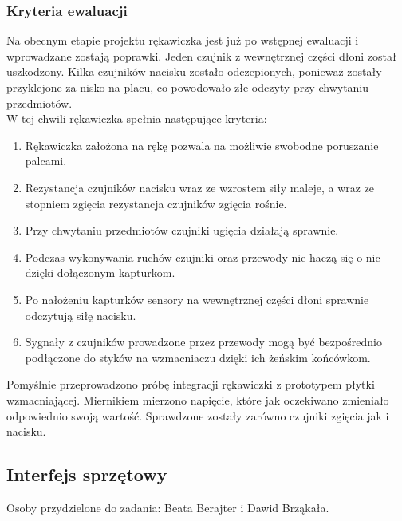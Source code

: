 ﻿\documentclass{article}
\begin{document}
\subsubsection{Kryteria ewaluacji}
Na obecnym etapie projektu rękawiczka jest już po wstępnej ewaluacji i wprowadzane zostają poprawki. Jeden czujnik z wewnętrznej części dłoni został uszkodzony. Kilka czujników nacisku zostało odczepionych, ponieważ zostały przyklejone za nisko na placu, co powodowało złe odczyty przy chwytaniu przedmiotów. \\
W tej chwili rękawiczka spełnia następujące kryteria:\\
\begin{enumerate}
  \item Rękawiczka założona na rękę pozwala na możliwie swobodne poruszanie palcami.
  \item Rezystancja czujników nacisku wraz ze wzrostem siły maleje, a wraz ze stopniem zgięcia rezystancja czujników zgięcia rośnie.
	\item Przy chwytaniu przedmiotów czujniki ugięcia działają sprawnie.
	\item Podczas wykonywania ruchów czujniki oraz przewody nie haczą się o nic dzięki dołączonym kapturkom.
	\item Po nałożeniu kapturków sensory na wewnętrznej części dłoni sprawnie odczytują siłę nacisku.
	\item Sygnały z czujników prowadzone przez przewody mogą być bezpośrednio podłączone do styków na wzmacniaczu dzięki ich żeńskim końcówkom.
\end{enumerate}
Pomyślnie przeprowadzono próbę integracji rękawiczki z prototypem płytki wzmacniającej. Miernikiem mierzono napięcie, które jak oczekiwano zmieniało odpowiednio swoją wartość. Sprawdzone zostały zarówno czujniki zgięcia jak i nacisku.

\subsection{Interfejs sprzętowy}

Osoby przydzielone do zadania: Beata Berajter i Dawid Brząkała. \\
\end{document}
